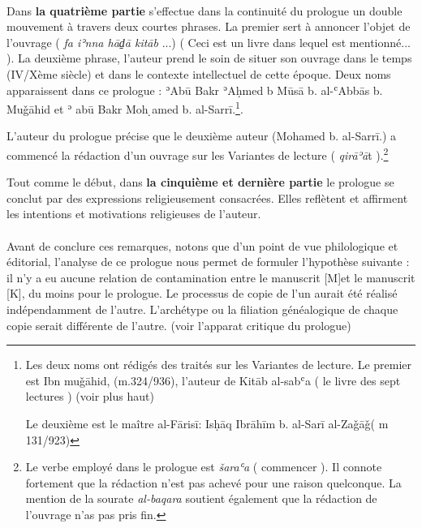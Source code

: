 \documentclass[a4paper,12pt]{report}
\begin{document}
\begin{itemize}
\begin{enumerate}
\paragraph{}
Dans  \textbf{ la quatrième partie} s’effectue dans la continuité du prologue un double mouvement à travers deux courtes phrases. La premier  sert à annoncer l’objet de  l'ouvrage ( \textit{fa iʾnna hād̠ā kitāb}  ...) ( Ceci est un livre dans lequel est mentionné...   ). La deuxième phrase, l’auteur prend le soin de situer son ouvrage dans le temps  (IV/Xème siècle) et dans le contexte intellectuel de cette époque.  Deux noms apparaissent dans ce prologue : ʾAb\=u Bakr ʾAḥmed b Mūsā b. al-ʿAbbās b. Muǧāhid et ʾ abū Bakr Moh ̣amed b. al-Sarrī.\footnote {Les deux noms ont rédigés des traités sur les Variantes de lecture. 
Le premier est Ibn muǧāhid,  (m.324/936), l'auteur de  Kitāb al-sabʿa ( le livre des sept lectures )  (voir plus haut)

Le deuxième est le maître al-F\=aris\=i:  Isḥāq Ibrāhīm b. al-Sarī al-Zaǧāǧ( m 131/923)}.

L'auteur du prologue  précise  que le deuxième auteur (Mohamed b. al-Sarrī.)  a commencé la rédaction   d’un ouvrage  sur les Variantes de lecture ( \textit{qirāʾā}t ).\footnote{Le verbe employé  dans le prologue est  \textit{šaraʿa} ( commencer ). Il  connote fortement que la rédaction n’est pas achevé pour une raison quelconque. La mention de la sourate \textit{al-baqara} soutient également que la rédaction de l’ouvrage n’as pas pris fin. }  

  Tout comme le début, dans \textbf{la cinquième et dernière partie} le prologue se conclut par des expressions religieusement  consacrées. Elles reflètent et affirment les intentions et motivations religieuses de l'auteur. 

  \paragraph{}

  Avant de conclure ces remarques, notons que d’un point de vue  philologique et éditorial, l’analyse de ce prologue nous permet de formuler l’hypothèse suivante : il n’y a eu aucune relation de contamination entre le manuscrit [M]et le manuscrit [K],  du moins pour le prologue. Le processus de copie de l’un aurait été réalisé indépendamment de l’autre. L’archétype ou la filiation généalogique de chaque copie serait   différente  de l’autre. (voir l'apparat critique du prologue) 


\end{enumerate}
\end{itemize}
\end{document}
